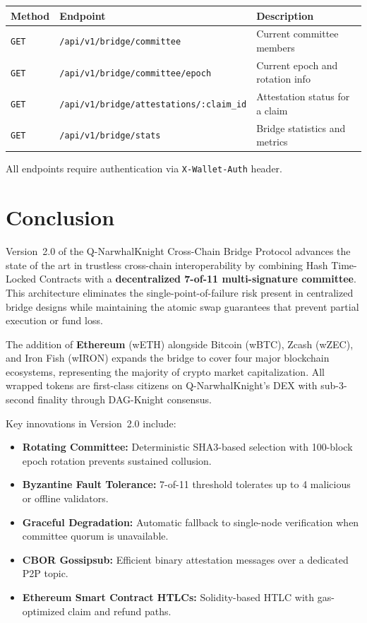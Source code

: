 \documentclass[11pt,a4paper]{article}
\begin{document}
\begin{table}[H]
\centering
\begin{tabularx}{\textwidth}{l l X}
\toprule
\textbf{Method} & \textbf{Endpoint} & \textbf{Description} \\
\midrule
\texttt{GET} & \texttt{/api/v1/bridge/committee} & Current committee members \\
\texttt{GET} & \texttt{/api/v1/bridge/committee/epoch} & Current epoch and rotation info \\
\texttt{GET} & \texttt{/api/v1/bridge/attestations/:claim\_id} & Attestation status for a claim \\
\texttt{GET} & \texttt{/api/v1/bridge/stats} & Bridge statistics and metrics \\
\bottomrule
\end{tabularx}
\end{table}

All endpoints require authentication via \texttt{X-Wallet-Auth} header.

\section{Conclusion}

Version~2.0 of the Q-NarwhalKnight Cross-Chain Bridge Protocol advances the state of the art in trustless cross-chain interoperability by combining Hash Time-Locked Contracts with a \textbf{decentralized 7-of-11 multi-signature committee}. This architecture eliminates the single-point-of-failure risk present in centralized bridge designs while maintaining the atomic swap guarantees that prevent partial execution or fund loss.

The addition of \textbf{Ethereum} (wETH) alongside Bitcoin (wBTC), Zcash (wZEC), and Iron Fish (wIRON) expands the bridge to cover four major blockchain ecosystems, representing the majority of crypto market capitalization. All wrapped tokens are first-class citizens on Q-NarwhalKnight's DEX with sub-3-second finality through DAG-Knight consensus.

Key innovations in Version~2.0 include:

\begin{itemize}
    \item \textbf{Rotating Committee:} Deterministic SHA3-based selection with 100-block epoch rotation prevents sustained collusion.
    \item \textbf{Byzantine Fault Tolerance:} 7-of-11 threshold tolerates up to 4 malicious or offline validators.
    \item \textbf{Graceful Degradation:} Automatic fallback to single-node verification when committee quorum is unavailable.
    \item \textbf{CBOR Gossipsub:} Efficient binary attestation messages over a dedicated P2P topic.
    \item \textbf{Ethereum Smart Contract HTLCs:} Solidity-based HTLC with gas-optimized claim and refund paths.
\end{itemize}
\end{document}
